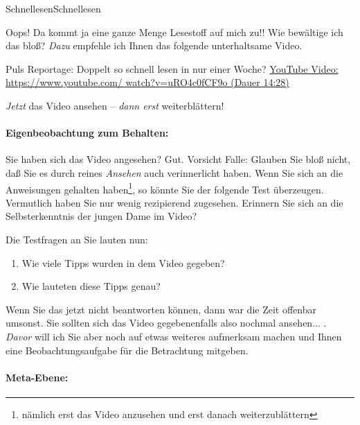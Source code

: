 



\unit{Schnellesen}{Schnellesen}

Oops! Da kommt ja eine ganze Menge Lesestoff auf mich zu!! Wie bewältige ich das bloß?
\textit{Dazu} empfehle ich Ihnen das folgende unterhaltsame Video.\label{video}


{Puls Reportage: Doppelt so schnell lesen in nur einer Woche?}
{}
{\href{https://www.youtube.com/watch?v=uRO4c0fCF9o}{YouTube Video: https://www.youtube.com/ watch?v=uRO4c0fCF9o (Dauer 14:28)}}

\textit{Jetzt} das Video ansehen -- \textit{dann erst} weiterblättern!

\newpage


\paragraph{Eigenbeobachtung zum Behalten:}
Sie haben sich das Video angesehen? Gut.
Vorsicht Falle: Glauben Sie bloß nicht, daß Sie es durch reines \textit{Ansehen} auch
verinnerlicht haben. Wenn Sie sich an die Anweisungen gehalten haben\footnote{nämlich erst
das Video anzusehen und erst danach weiterzublättern}, so könnte Sie der folgende Test
überzeugen. Vermutlich haben Sie nur wenig rezipierend zugesehen. Erinnern Sie
sich an die Selbsterkenntnis der jungen Dame im Video?

Die Testfragen an Sie lauten nun:
\begin{enumerate}
\item Wie viele Tipps wurden in dem Video gegeben?
\item Wie lauteten diese Tipps genau?
\end{enumerate}

Wenn Sie das jetzt nicht beantworten können, dann war die Zeit offenbar umsonst.
Sie sollten sich das Video gegebenenfalls also nochmal ansehen... \frownie{}. \textit{Davor} will ich Sie
aber noch auf etwas weiteres aufmerksam machen und Ihnen eine Beobachtungsaufgabe für die Betrachtung
mitgeben.

\paragraph{Meta-Ebene:}

